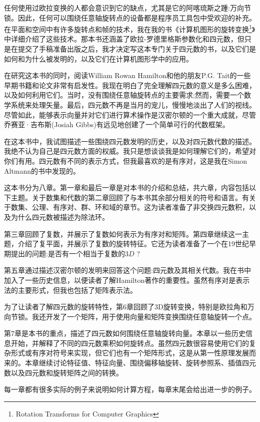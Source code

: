 任何使用过欧拉变换的人都会意识到它的缺点，尤其是它的阿喀琉斯之踵:万向节锁。因此，任何可以围绕任意轴旋转点的设备都是程序员工具包中受欢迎的补充。在平面和空间中有许多旋转点和帧的技术，我在我的书《计算机图形的旋转变换\footnote{Rotation Transforms for Computer Graphics}》中详细介绍了这些技术。那本书还涵盖了欧拉-罗德里格斯参数化和四元数，但只是在提交了手稿准备出版之后，我才决定写这本专门关于四元数的书，以及它们是如何和为什么被发明的，以及它们在计算机图形学中的应用。

在研究这本书的同时，阅读William Rowan Hamilton和他的朋友P.G. Tait的一些早期书籍和论文非常有启发性。我现在明白了完全理解四元数的意义是多么困难，以及如何利用它们。当时，没有围绕任意轴旋转点的主要需求;然而，需要一个数学系统来处理矢量。最后，四元数不再是当月的宠儿，慢慢地淡出了人们的视线。尽管如此，能够表示向量并对它们进行算术操作是汉密尔顿的一个重大成就，尽管乔赛亚·吉布斯(Josiah Gibbs)有远见地创建了一个简单可行的代数框架。

在这本书中，我试图描述一些围绕四元数发明的历史，以及对四元数代数的描述。我绝不认为自己是四元数方面的权威。我只是想谈谈我是如何理解它们的，希望对你们有用。四元数有不同的表示方式，但我最喜欢的是有序对，这是我在Simon Altmann的书中发现的。

这本书分为八章。第一章和最后一章是对本书的介绍和总结，共六章，内容包括以下主题。关于数集和代数的第二章回顾了与本书其余部分相关的符号和语言。有关于数集、公理、有序对、群、环和域的章节。这为读者准备了非交换四元数积，以及为什么四元数被描述为除法环。

第三章回顾了复数，并展示了复数如何表示为有序对和矩阵。第四章继续这一主题，介绍了复平面，并展示了复数的旋转特征。它还为读者准备了一个在19世纪早期提出的问题:是否有一个相当于复数的$3 D$ ?

第五章通过描述汉密尔顿的发明来回答这个问题:四元数及其相关代数。我在书中加入了一些历史信息，以便读者了解Hamilton著作的重要性。虽然有序对是表示法的主要形式，但我也包括了矩阵表示法。

为了让读者了解四元数的旋转特性，第6章回顾了3D旋转变换，特别是欧拉角和万向节锁。我还开发了一个矩阵，用于使用向量和矩阵变换围绕任意轴旋转一个点。

第7章是本书的重点，描述了四元数如何围绕任意轴旋转向量。本章以一些历史信息开始，并解释了不同的四元数乘积如何旋转点。虽然四元数很容易使用它们的复杂形式或有序对符号来实现，但它们也有一个矩阵形式，这是从第一性原理发展而来的。本章继续讨论特征值、特征向量、围绕偏移轴旋转、旋转参照系、插值四元数以及四元数和旋转矩阵之间的转换。

每一章都有很多实际的例子来说明如何计算方程，每章末尾会给出进一步的例子。

